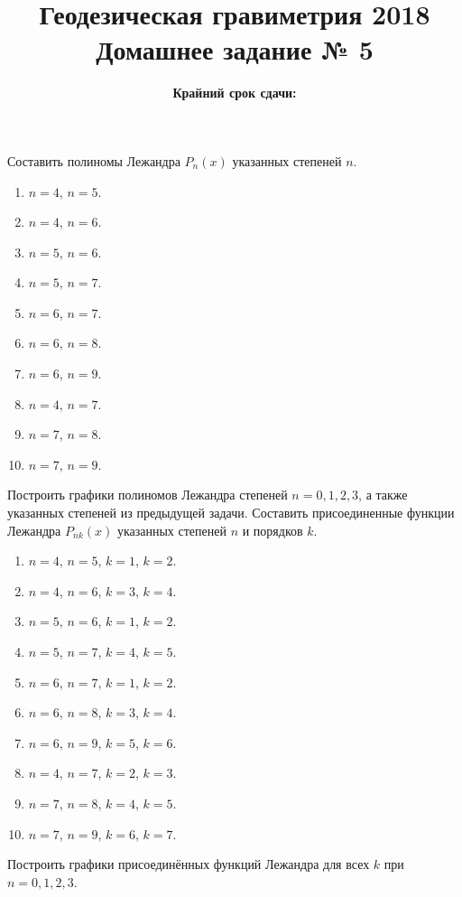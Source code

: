 \documentclass[11pt, a4paper,addpoints]{exam}
\title{{\Large Геодезическая гравиметрия 2018}\\ 
    {\bf\Large Домашнее задание № 5}}
\author{}
\date{\normalsize\bf Крайний срок сдачи: \DTMusedate{deadline}}
\theoremstyle{remark}
\begin{document}
\maketitle
\thispagestyle{empty}
\begin{questions}
    \question[1] Составить полиномы Лежандра $P_{n} \left( x \right)$ указанных степеней $n$.
    \begin{enumerate}
        \item $n = 4$, $n = 5$.
        \item $n = 4$, $n = 6$.
        \item $n = 5$, $n = 6$.
        \item $n = 5$, $n = 7$.
        \item $n = 6$, $n = 7$.
        \item $n = 6$, $n = 8$.
        \item $n = 6$, $n = 9$.
        \item $n = 4$, $n = 7$.
        \item $n = 7$, $n = 8$.
        \item $n = 7$, $n = 9$.
    \end{enumerate}
    \question[1] Построить графики полиномов Лежандра степеней $n = 0, 1, 2, 3$, а также указанных
    степеней из предыдущей задачи.
    \question[1] Составить присоединенные функции Лежандра $P_{nk} \left( x \right)$ указанных
    степеней $n$ и порядков $k$.
    \begin{enumerate}
        \item $n = 4$, $n = 5$, $k = 1$, $k = 2$.
        \item $n = 4$, $n = 6$, $k = 3$, $k = 4$.
        \item $n = 5$, $n = 6$, $k = 1$, $k = 2$.
        \item $n = 5$, $n = 7$, $k = 4$, $k = 5$.
        \item $n = 6$, $n = 7$, $k = 1$, $k = 2$.
        \item $n = 6$, $n = 8$, $k = 3$, $k = 4$.
        \item $n = 6$, $n = 9$, $k = 5$, $k = 6$.
        \item $n = 4$, $n = 7$, $k = 2$, $k = 3$.
        \item $n = 7$, $n = 8$, $k = 4$, $k = 5$.
        \item $n = 7$, $n = 9$, $k = 6$, $k = 7$.
    \end{enumerate}
    \question[2] Построить графики присоединённых функций Лежандра для всех $k$ при $n = 0, 1, 2, 3$.
    \end{questions}
\end{document}
